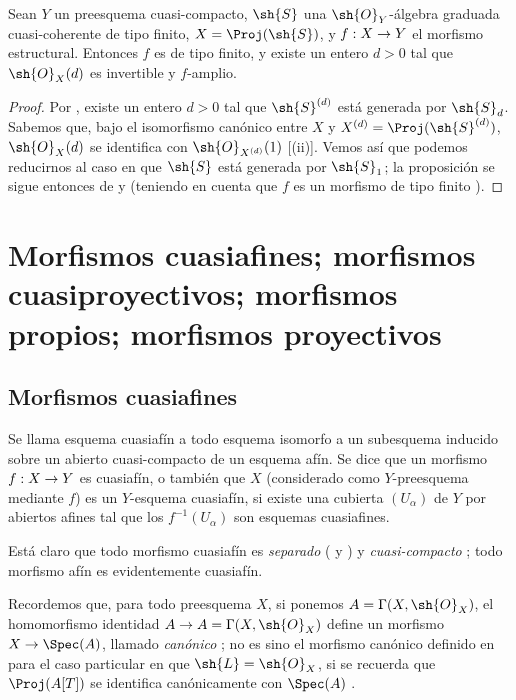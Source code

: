 \documentclass[oneside,10pt]{amsart}
\makeatletter
\newcommand{\ega@arrow}[2]{\mathchoice{#1}{#2}{#2}{#2}}
\renewcommand{\to}{\ega@arrow{\longrightarrow}{\rightarrow}}
\let\EGAOriginalLabel\label
\renewcommand{\label}[1]{\phantomsection\EGAOriginalLabel{#1}}
\makeatother
\begin{document}
\begin{proposition}[4.6.18]
\label{II.4.6.18}
Sean $Y$ un preesquema cuasi-compacto, $\sh{S}$ una $\sh{O}_Y$-álgebra graduada cuasi-coherente de tipo finito, $X=\Proj(\sh{S})$, y $f:X\to Y$ el morfismo estructural.
Entonces $f$ es de tipo finito, y existe un entero $d>0$ tal que $\sh{O}_X(d)$ es invertible y $f$-amplio.
\end{proposition}

\begin{proof}
Por , existe un entero $d>0$ tal que $\sh{S}^{(d)}$ está generada por $\sh{S}_d$.
Sabemos que, bajo el isomorfismo canónico entre $X$ y $X^{(d)}=\Proj(\sh{S}^{(d)})$, $\sh{O}_X(d)$ se identifica con $\sh{O}_{X^{(d)}}(1)$ [(ii)].
Vemos así que podemos reducirnos al caso en que $\sh{S}$ está generada por $\sh{S}_1$;
la proposición se sigue entonces de  y  (teniendo en cuenta que $f$ es un morfismo de tipo finito ).
\end{proof}

\section{Morfismos cuasiafines; morfismos cuasiproyectivos; morfismos propios; morfismos proyectivos}
\label{section:II.5}

\subsection{Morfismos cuasiafines}
\label{subsection:II.5.1}

\begin{definition}[5.1.1]
\label{II.5.1.1}
Se llama esquema cuasiafín a todo esquema isomorfo a un subesquema inducido sobre un abierto cuasi-compacto de un esquema afín.
Se dice que un morfismo $f:X\to Y$ es cuasiafín, o también que $X$ (considerado como $Y$-preesquema mediante $f$) es un $Y$-esquema cuasiafín, si existe una cubierta $(U_\alpha)$ de $Y$ por abiertos afines tal que los $f^{-1}(U_\alpha)$ son esquemas cuasiafines.
\end{definition}

Está claro que todo morfismo cuasiafín es \emph{separado} ( y ) y \emph{cuasi-compacto} ;
todo morfismo afín es evidentemente cuasiafín.

Recordemos que, para todo preesquema $X$, si ponemos $A=\Gamma(X,\sh{O}_X)$, el homomorfismo identidad $A\to A=\Gamma(X,\sh{O}_X)$ define un morfismo $X\to\Spec(A)$, llamado \emph{canónico} ;
no es sino el morfismo canónico definido en  para el caso particular en que $\sh{L}=\sh{O}_X$, si se recuerda que $\Proj(A[T])$ se identifica canónicamente con $\Spec(A)$ .
\end{document}
